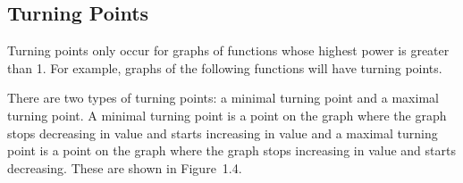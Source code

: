             \subsection{ Turning Points}
            \nopagebreak
        \label{m39337*id236645}Turning points only occur for graphs of functions whose highest power is greater than 1. For example, graphs of the following functions will have turning points.\par 
        \label{m39337*id236652}\nopagebreak\noindent{}
        \label{m39337*id236788}There are two types of turning points: a minimal turning point and a maximal turning point. A minimal turning point is a point on the graph where the graph stops decreasing in value and starts increasing in value and a maximal turning point is a point on the graph where the graph stops increasing in value and starts decreasing. These are shown in Figure~1.4.\par 
